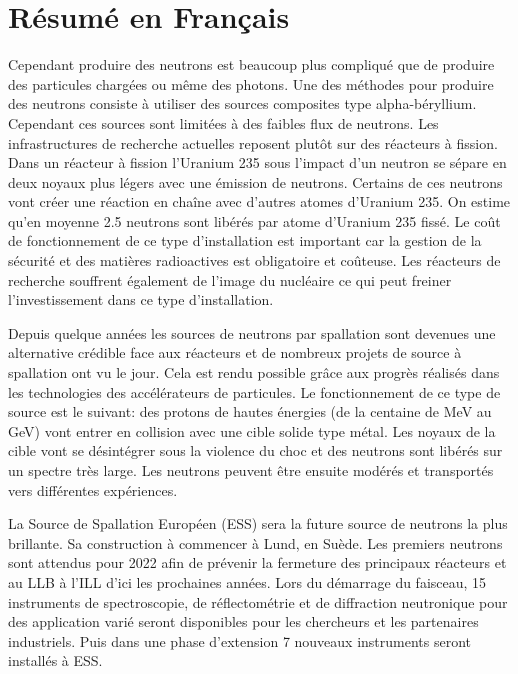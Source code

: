 \chapter*{Résumé en Français}
%

Cependant produire des neutrons est beaucoup plus compliqué que de produire des particules chargées ou même des photons. Une des méthodes pour produire des neutrons consiste à utiliser des sources composites type alpha-béryllium. Cependant ces sources sont limitées à des faibles flux de neutrons. Les infrastructures de recherche actuelles reposent plutôt sur des réacteurs à fission. Dans un réacteur à fission l’Uranium 235 sous l’impact d’un neutron se sépare en deux noyaux plus légers avec une émission de neutrons. Certains de ces neutrons vont créer une réaction en chaîne avec d’autres atomes d’Uranium 235. On estime qu’en moyenne 2.5 neutrons sont libérés par atome d’Uranium 235 fissé. Le coût de fonctionnement de ce type d’installation est important car la gestion de la sécurité et des matières radioactives est obligatoire et coûteuse. Les réacteurs de recherche souffrent également de l’image du nucléaire ce qui peut freiner l’investissement dans ce type d’installation.

Depuis quelque années les sources de neutrons par spallation sont devenues une alternative crédible face aux réacteurs et de nombreux projets de source à spallation ont vu le jour. Cela est rendu possible grâce aux progrès réalisés dans les technologies des accélérateurs de particules. Le fonctionnement de ce type de source est le suivant: des protons de hautes énergies (de la centaine de MeV au GeV) vont entrer en collision avec une cible solide type métal. Les noyaux de la cible vont se désintégrer sous la violence du choc et des neutrons sont libérés sur un spectre très large. Les neutrons peuvent être ensuite modérés et transportés vers différentes expériences.

La Source de Spallation Européen (ESS) sera la future source de neutrons la plus brillante. Sa construction à commencer à Lund, en Suède. Les premiers neutrons sont attendus pour 2022 afin de prévenir la fermeture des principaux réacteurs et au LLB à l’ILL d’ici les prochaines années. Lors du démarrage du faisceau, 15 instruments de spectroscopie, de réflectométrie et de diffraction neutronique pour des application varié seront disponibles pour les chercheurs et les partenaires industriels. Puis dans une phase d’extension 7 nouveaux instruments seront installés à ESS.
